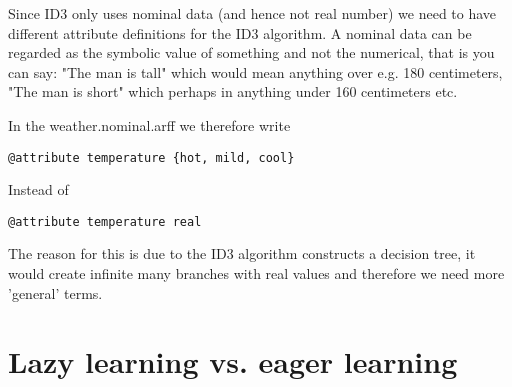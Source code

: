 \documentclass{article}
\begin{document}
\begin{enumerate}[1.]
Since ID3 only uses nominal data (and hence not real number) we need to have
different attribute definitions for the ID3 algorithm. A nominal data can be
regarded as the symbolic value of something and not the numerical, that is you
can say: "The man is tall" which would mean anything over e.g. 180 centimeters,
"The man is short" which perhaps in anything under 160 centimeters etc.

In the weather.nominal.arff we therefore write

\begin{verbatim}
@attribute temperature {hot, mild, cool}
\end{verbatim}

Instead of

\begin{verbatim}
@attribute temperature real
\end{verbatim}

The reason for this is due to the ID3 algorithm constructs a decision tree, it
would create infinite many branches with real values and therefore we need more
'general' terms.

\end{enumerate}

\section*{Lazy learning vs. eager learning}
\end{document}
